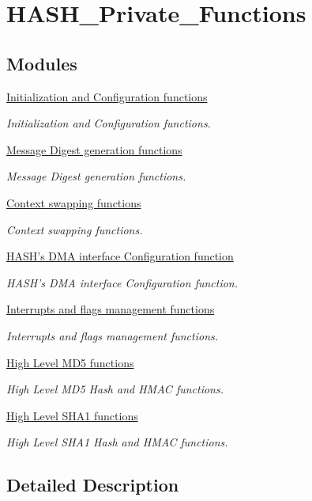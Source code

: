 \hypertarget{group___h_a_s_h___private___functions}{\section{H\-A\-S\-H\-\_\-\-Private\-\_\-\-Functions}
\label{group___h_a_s_h___private___functions}
}
\subsection*{Modules}
\begin{DoxyCompactItemize}
\item 
\hyperlink{group___h_a_s_h___group1}{Initialization and Configuration functions}
\begin{DoxyCompactList}\small\item\em Initialization and Configuration functions. \end{DoxyCompactList}\item 
\hyperlink{group___h_a_s_h___group2}{Message Digest generation functions}
\begin{DoxyCompactList}\small\item\em Message Digest generation functions. \end{DoxyCompactList}\item 
\hyperlink{group___h_a_s_h___group3}{Context swapping functions}
\begin{DoxyCompactList}\small\item\em Context swapping functions. \end{DoxyCompactList}\item 
\hyperlink{group___h_a_s_h___group4}{H\-A\-S\-H's D\-M\-A interface Configuration function}
\begin{DoxyCompactList}\small\item\em H\-A\-S\-H's D\-M\-A interface Configuration function. \end{DoxyCompactList}\item 
\hyperlink{group___h_a_s_h___group5}{Interrupts and flags management functions}
\begin{DoxyCompactList}\small\item\em Interrupts and flags management functions. \end{DoxyCompactList}\item 
\hyperlink{group___h_a_s_h___group7}{High Level M\-D5 functions}
\begin{DoxyCompactList}\small\item\em High Level M\-D5 Hash and H\-M\-A\-C functions. \end{DoxyCompactList}\item 
\hyperlink{group___h_a_s_h___group6}{High Level S\-H\-A1 functions}
\begin{DoxyCompactList}\small\item\em High Level S\-H\-A1 Hash and H\-M\-A\-C functions. \end{DoxyCompactList}\end{DoxyCompactItemize}


\subsection{Detailed Description}
